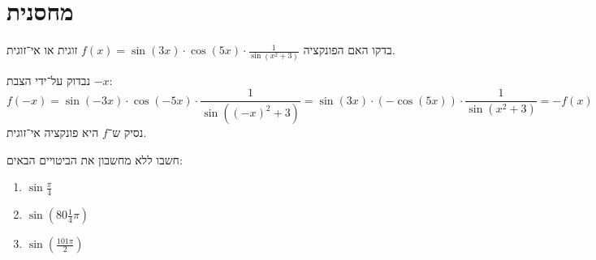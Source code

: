 \section{מחסנית}
\begin{exercise}
	בדקו האם הפונקציה $f(x) = \sin(3x) \cdot \cos(5x) \cdot \frac{1}{\sin(x^2 + 3)}$ זוגית או אי־זוגית.
\end{exercise}
\begin{solution}
	נבדוק על־ידי הצבת $-x$:
	\[
		f(-x)
		= \sin(-3x) \cdot \cos(-5x) \cdot \frac{1}{\sin({(-x)}^2 + 3)}
		= \sin(3x) \cdot (-\cos(5x)) \cdot \frac{1}{\sin(x^2 + 3)}
		= -f(x)
	\]
	נסיק ש־$f$ היא פונקציה אי־זוגית.
\end{solution}
\begin{exercise}
	חשבו ללא מחשבון את הביטויים הבאים:
	\begin{enumerate}
		\item $\sin \frac{\pi}{4}$
		\item $\sin(80 \frac{1}{4} \pi)$
		\item $\sin(\frac{101 \pi}{2})$
	\end{enumerate}
\end{exercise}
